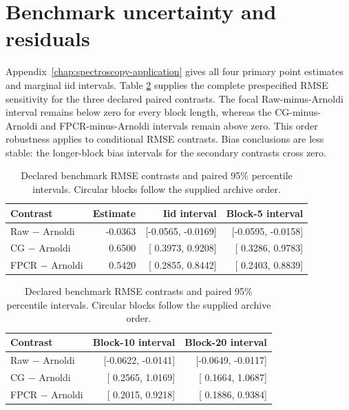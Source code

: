 \section{Benchmark uncertainty and residuals}
\label{sec:app-spectroscopy-uncertainty}

Appendix~\ref{chap:spectroscopy-application} gives all four primary point
estimates and marginal iid intervals.  Table
\ref{tab:app-spectroscopy-rmse-contrasts} supplies the complete prespecified
RMSE sensitivity for the three declared paired contrasts.  The focal
Raw-minus-Arnoldi interval remains below zero for every block length,
whereas the CG-minus-Arnoldi and FPCR-minus-Arnoldi intervals remain above zero.  This order
robustness applies to conditional RMSE contrasts.  Bias conclusions are less
stable: the longer-block bias intervals for the secondary contrasts cross
zero.

\begin{table}[htbp]
    \centering
    \small
    \caption[Paired benchmark RMSE contrasts and intervals]{Declared benchmark RMSE contrasts and paired 95\% percentile
    intervals.  Circular blocks follow the supplied archive order.}
    \label{tab:app-spectroscopy-rmse-contrasts}
    \begin{tabular}{@{}lrrr@{}}
        \toprule
        Contrast & Estimate & Iid interval & Block-5 interval \\
        \midrule
        Raw $-$ Arnoldi
          & -0.0363 & [-0.0565, -0.0169] & [-0.0595, -0.0158] \\
        CG $-$ Arnoldi
          &  0.6500 & [ 0.3973,  0.9208] & [ 0.3286,  0.9783] \\
        FPCR $-$ Arnoldi
          &  0.5420 & [ 0.2855,  0.8442] & [ 0.2403,  0.8839] \\
        \bottomrule
    \end{tabular}
    \par\medskip
    \begin{tabular}{@{}lrr@{}}
        \toprule
        Contrast & Block-10 interval & Block-20 interval \\
        \midrule
        Raw $-$ Arnoldi & [-0.0622, -0.0141] & [-0.0649, -0.0117] \\
        CG $-$ Arnoldi & [ 0.2565,  1.0169] & [ 0.1664,  1.0687] \\
        FPCR $-$ Arnoldi & [ 0.2015,  0.9218] & [ 0.1886,  0.9384] \\
        \bottomrule
    \end{tabular}
\end{table}

